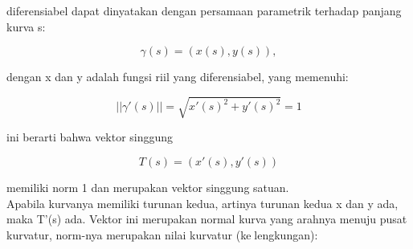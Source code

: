 \documentclass[12pt,Times new roman,letterpaper]{book}
\begin{document}
\begin{eulernootebook}
\begin{eulercomment}
\begin{eulercomment}
\begin{eulernootebook}
\begin{eulercomment}
\begin{eulercomment}
\begin{eulercomment}
\begin{eulercomment}
\begin{eulercomment}
\begin{eulercomment}
\begin{eulernotebook}
\begin{eulercomment}
\begin{eulercomment}
\begin{eulercomment}
\begin{eulercomment}
\begin{eulercomment}
\begin{eulercomment}
\begin{eulercomment}
\begin{eulercomment}
\begin{eulercomment}
\begin{eulercomment}
\begin{eulercomment}
\begin{eulercomment}
\begin{eulercomment}
\begin{eulercomment}
\begin{eulercomment}
\begin{eulercomment}
\begin{eulercomment}
\begin{eulercomment}
\begin{eulercomment}
\begin{eulercomment}
\begin{eulercomment}
diferensiabel dapat dinyatakan dengan persamaan parametrik terhadap
panjang kurva s:

\end{eulercomment}
\begin{eulerformula}
\[
\gamma(s)=(x(s),y(s)),
\]
\end{eulerformula}
\begin{eulercomment}
dengan x dan y adalah fungsi riil yang diferensiabel, yang memenuhi:

\end{eulercomment}
\begin{eulerformula}
\[
||\gamma'(s)||=\sqrt{x'(s)^2+y'(s)^2}=1
\]
\end{eulerformula}
\begin{eulercomment}
ini berarti bahwa vektor singgung

\end{eulercomment}
\begin{eulerformula}
\[
T(s)=(x'(s),y'(s))
\]
\end{eulerformula}
\begin{eulercomment}
memiliki norm 1 dan merupakan vektor singgung satuan.\\
Apabila kurvanya memiliki turunan kedua, artinya turunan kedua x dan y
ada, maka T’(s) ada. Vektor ini merupakan normal kurva yang arahnya
menuju pusat kurvatur, norm-nya merupakan nilai kurvatur
(kelengkungan):


\end{eulercomment}
\end{eulercomment}
\end{eulercomment}
\end{eulercomment}
\end{eulercomment}
\end{eulercomment}
\end{eulercomment}
\end{eulercomment}
\end{eulercomment}
\end{eulercomment}
\end{eulercomment}
\end{eulercomment}
\end{eulercomment}
\end{eulercomment}
\end{eulercomment}
\end{eulercomment}
\end{eulercomment}
\end{eulercomment}
\end{eulercomment}
\end{eulercomment}
\end{eulercomment}
\end{eulernotebook}
\end{eulercomment}
\end{eulercomment}
\end{eulercomment}
\end{eulercomment}
\end{eulercomment}
\end{eulercomment}
\end{eulernootebook}
\end{eulercomment}
\end{eulercomment}
\end{eulernootebook}
\end{document}
